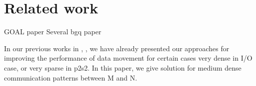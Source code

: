 \section{Related work}
\label{sec:relatedwork}

GOAL paper \cite{singh2003:goal}
Several bgq paper

In our previous works in \cite{Vishwanath:GLEAN}, \cite{SDAV:Bui2014b}, \cite{hbui:bgq} we have already presented our approaches for improving the performance of data movement for certain cases very dense in I/O case, or very sparse in p2s2. In this paper, we give solution for medium dense communication patterns between M and N.
